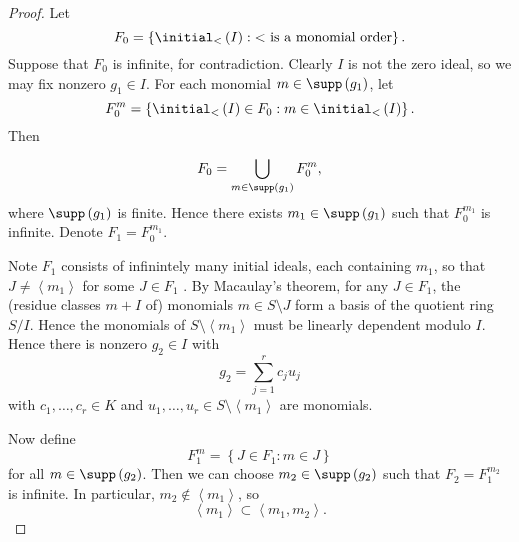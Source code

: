 \documentclass[co439]{subfiles}
\begin{document}
    \begin{proof}
        Let
        \begin{equation*}
            F_0 = \left\lbrace \initial_{<}\left( I \right) : \text{$<$ is a monomial order} \right\rbrace.
        \end{equation*}
        Suppose that $F_0$ is infinite, for contradiction. Clearly $I$ is not the zero ideal, so we may fix nonzero $g_1\in I$. For each monomial $m\in\supp\left( g_1 \right)$, let
        \begin{equation*}
            F_0^m = \left\lbrace \initial_{<}\left( I \right)\in F_0 : m\in\initial_{<}\left( I \right) \right\rbrace.
        \end{equation*}
        Then
        \begin{equation*}
            F_0 = \bigcup^{}_{m\in\supp\left( g_1 \right)} F_0^m,
        \end{equation*}
        where $\supp\left( g_1 \right)$ is finite. Hence there exists $m_1\in\supp\left( g_1 \right)$ such that $F_0^{m_1}$ is infinite. Denote $F_1 = F_0^{m_1}$.

        Note $F_1$ consists of infinintely many initial ideals, each containing $m_1$, so that $J\neq\left< m_1 \right>$ for some $J\in F_1$ . By Macaulay's theorem, for any $J\in F_1$, the (residue classes $m+I$ of) monomials $m\in S\setminus J$ form a basis of the quotient ring $S /I$. Hence the monomials of $S\setminus\left< m_1 \right>$ must be linearly dependent modulo $I$. Hence there is nonzero $g_2\in I$ with
        \begin{equation*}
            g_2 = \sum^{r}_{j=1} c_ju_j
        \end{equation*}
        with $c_1,\ldots,c_r\in K$ and $u_1,\ldots,u_r\in S\setminus\left< m_1 \right>$ are monomials.

        Now define
        \begin{equation*}
            F_1^{m} = \left\lbrace J\in F_1: m\in J \right\rbrace
        \end{equation*}
        for all $m\in\supp\left( g_2 \right)$. Then we can choose $m_2\in\supp\left( g_2 \right)$ such that $F_2 = F_1^{m_2}$ is infinite. In particular, $m_2\notin\left< m_1 \right>$, so 
        \begin{equation*}
            \left< m_1 \right>\subset\left< m_1,m_2 \right>.
        \end{equation*}


\end{proof}
\end{document}
